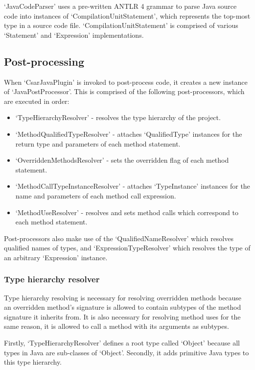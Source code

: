 \documentclass[12pt, letterpaper]{article}
\begin{document}
`JavaCodeParser' uses a pre-written ANTLR 4 grammar to parse Java source code into instances of `CompilationUnitStatement', which represents the top-most type in a source code file.
`CompilationUnitStatement' is comprised of various `Statement' and `Expression' implementations.

\subsection{Post-processing}
When `CsarJavaPlugin' is invoked to post-process code, it creates a new instance of `JavaPostProcessor'.
This is comprised of the following post-processors, which are executed in order:
\begin{itemize}
  \item `TypeHierarchyResolver' - resolves the type hierarchy of the project.
  \item `MethodQualifiedTypeResolver' - attaches `QualifiedType' instances for the return type and parameters of each method statement.
  \item `OverriddenMethodsResolver' - sets the overridden flag of each method statement.
  \item `MethodCallTypeInstanceResolver' - attaches `TypeInstance' instances for the name and parameters of each method call expression.
  \item `MethodUseResolver' - resolves and sets method calls which correspond to each method statement.
\end{itemize}

Post-processors also make use of the `QualifiedNameResolver' which resolves qualified names of types, and `ExpressionTypeResolver' which resolves the type of an arbitrary `Expression' instance.

\subsubsection{Type hierarchy resolver}
Type hierarchy resolving is necessary for resolving overridden methods because an overridden method's signature is allowed to contain subtypes of the method signature it inherits from.
It is also necessary for resolving method uses for the same reason, it is allowed to call a method with its arguments as subtypes.

Firstly, `TypeHierarchyResolver' defines a root type called `Object' because all types in Java are sub-classes of `Object'.
Secondly, it adds primitive Java types to this type hierarchy.
\end{document}
